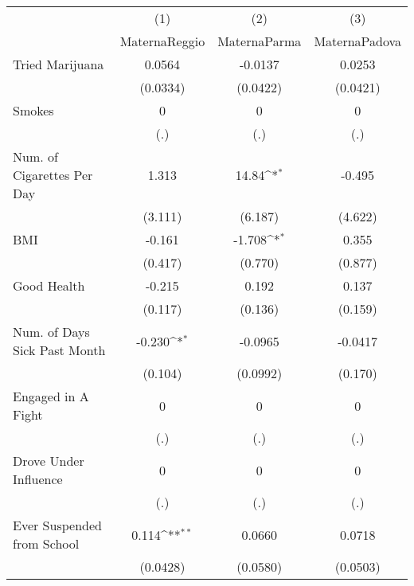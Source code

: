 {
\def\sym#1{\ifmmode^{#1}\else\(^{#1}\)\fi}
\begin{tabular}{l*{3}{c}}
\hline\hline
            &\multicolumn{1}{c}{(1)}&\multicolumn{1}{c}{(2)}&\multicolumn{1}{c}{(3)}\\
            &\multicolumn{1}{c}{MaternaReggio}&\multicolumn{1}{c}{MaternaParma}&\multicolumn{1}{c}{MaternaPadova}\\
\hline
Tried Marijuana&      0.0564         &     -0.0137         &      0.0253         \\
            &    (0.0334)         &    (0.0422)         &    (0.0421)         \\
[1em]
Smokes      &           0         &           0         &           0         \\
            &         (.)         &         (.)         &         (.)         \\
[1em]
Num. of Cigarettes Per Day&       1.313         &       14.84\sym{*}  &      -0.495         \\
            &     (3.111)         &     (6.187)         &     (4.622)         \\
[1em]
BMI         &      -0.161         &      -1.708\sym{*}  &       0.355         \\
            &     (0.417)         &     (0.770)         &     (0.877)         \\
[1em]
Good Health &      -0.215         &       0.192         &       0.137         \\
            &     (0.117)         &     (0.136)         &     (0.159)         \\
[1em]
Num. of Days Sick Past Month&      -0.230\sym{*}  &     -0.0965         &     -0.0417         \\
            &     (0.104)         &    (0.0992)         &     (0.170)         \\
[1em]
Engaged in A Fight&           0         &           0         &           0         \\
            &         (.)         &         (.)         &         (.)         \\
[1em]
Drove Under Influence&           0         &           0         &           0         \\
            &         (.)         &         (.)         &         (.)         \\
[1em]
Ever Suspended from School&       0.114\sym{**} &      0.0660         &      0.0718         \\
            &    (0.0428)         &    (0.0580)         &    (0.0503)         \\

\end{tabular}}
